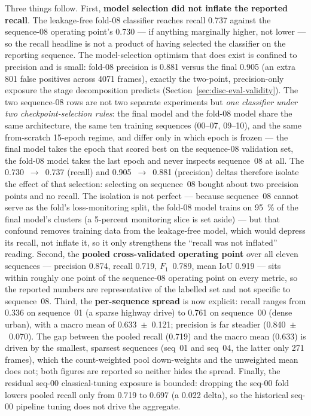 Three things follow. First, \textbf{model selection did not inflate the reported
recall}. The leakage-free fold-08 classifier reaches recall \num{0.737} against
the sequence-08 operating point's \num{0.730} --- if anything marginally higher,
not lower --- so the recall headline is not a product of having selected the
classifier on the reporting sequence. The model-selection optimism that does
exist is confined to precision and is small: fold-08 precision is \num{0.881}
versus the final \num{0.905} (an extra \num{801} false positives across
\num{4071} frames), exactly the two-point, precision-only exposure the stage
decomposition predicts (Section~\ref{sec:disc-eval-validity}). The two
sequence-08 rows are not two separate experiments but \emph{one classifier under
two checkpoint-selection rules}: the final model and the fold-08 model share the
same architecture, the same ten training sequences (\numrange{00}{07},
\numrange{09}{10}), and the same from-scratch \num{15}-epoch regime, and differ
only in which epoch is frozen --- the final model takes the epoch that scored
best on the sequence-08 validation set, the fold-08 model takes the last epoch and
never inspects sequence~08 at all. The \num{0.730}~$\rightarrow$~\num{0.737}
(recall) and \num{0.905}~$\rightarrow$~\num{0.881} (precision) deltas therefore
isolate the effect of that selection: selecting on sequence~08 bought about two
precision points and no recall. The isolation is not perfect --- because
sequence~08 cannot serve as the fold's loss-monitoring split, the fold-08 model
trains on \SI{95}{\percent} of the final model's clusters (a \num{5}-percent
monitoring slice is set aside) --- but that confound removes training data from
the leakage-free model, which would depress its recall, not inflate it, so it only
strengthens the ``recall was not inflated'' reading. Second, the
\textbf{pooled cross-validated operating point} over all eleven sequences ---
precision \num{0.874}, recall \num{0.719}, $F_1$~\num{0.789}, mean IoU
\num{0.919} --- sits within roughly one point of the sequence-08 operating point
on every metric, so the reported numbers are representative of the labelled set
and not specific to sequence~08. Third, the \textbf{per-sequence spread} is now
explicit: recall ranges from \num{0.336} on sequence~01 (a sparse highway drive)
to \num{0.761} on sequence~00 (dense urban), with a macro mean of
\num{0.633}~$\pm$~\num{0.121}; precision is far steadier
(\num{0.840}~$\pm$~\num{0.070}). The gap between the pooled recall (\num{0.719})
and the macro mean (\num{0.633}) is driven by the smallest, sparsest sequences
(seq~01 and seq~04, the latter only \num{271} frames), which the count-weighted
pool down-weights and the unweighted mean does not; both figures are reported so
neither hides the spread. Finally, the residual seq-00 classical-tuning exposure
is bounded: dropping the seq-00 fold lowers pooled recall only from \num{0.719}
to \num{0.697} (a \num{0.022} delta), so the historical seq-00 pipeline tuning
does not drive the aggregate.

